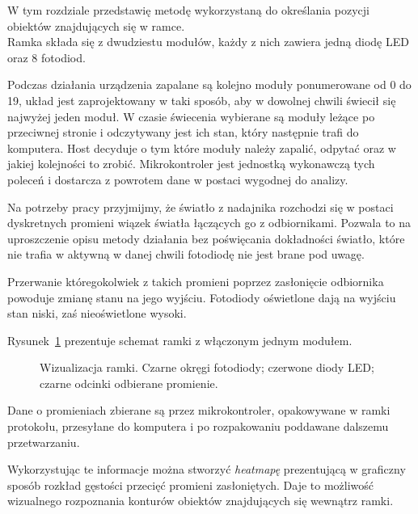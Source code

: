 \label{ch:method}

W tym rozdziale przedstawię metodę wykorzystaną do określania pozycji obiektów znajdujących się w ramce.\\

Ramka składa się z dwudziestu modułów, każdy z nich zawiera jedną diodę LED oraz 8 fotodiod.

Podczas działania urządzenia zapalane są kolejno moduły ponumerowane od 0 do 19, układ jest zaprojektowany w taki sposób, aby w dowolnej chwili świecił się najwyżej jeden moduł. W czasie świecenia wybierane są moduły leżące po przeciwnej stronie i odczytywany jest ich stan, który następnie trafi do komputera. Host decyduje o tym które moduły należy zapalić, odpytać oraz w jakiej kolejności to zrobić. Mikrokontroler jest jednostką wykonawczą tych poleceń i dostarcza z powrotem dane w postaci wygodnej do analizy.

Na potrzeby pracy przyjmijmy, że światło z nadajnika rozchodzi się w postaci dyskretnych promieni \pauza wiązek światła łączących go z odbiornikami. Pozwala to na uproszczenie opisu metody działania bez poświęcania dokładności \pauza światło, które nie trafia w aktywną w danej chwili fotodiodę nie jest brane pod uwagę.

Przerwanie któregokolwiek z takich promieni poprzez zasłonięcie odbiornika powoduje zmianę stanu na jego wyjściu. Fotodiody oświetlone dają na wyjściu stan niski, zaś nieoświetlone \ppauza wysoki.

Rysunek~\ref{fig:scene_rays_sample} prezentuje schemat ramki z włączonym jednym modułem.

\begin{figure}
 
 \caption{Wizualizacja ramki. Czarne okręgi \ppauza fotodiody; czerwone \ppauza diody LED; czarne odcinki \ppauza odbierane promienie.}
 \label{fig:scene_rays_sample}
\end{figure}

Dane o promieniach zbierane są przez mikrokontroler, opakowywane w ramki protokołu, przesyłane do komputera i po rozpakowaniu poddawane dalszemu przetwarzaniu.

Wykorzystując te informacje można stworzyć \textit{heatmapę} prezentującą w graficzny sposób rozkład gęstości przecięć promieni zasłoniętych. Daje to możliwość wizualnego rozpoznania konturów obiektów znajdujących się wewnątrz ramki.

